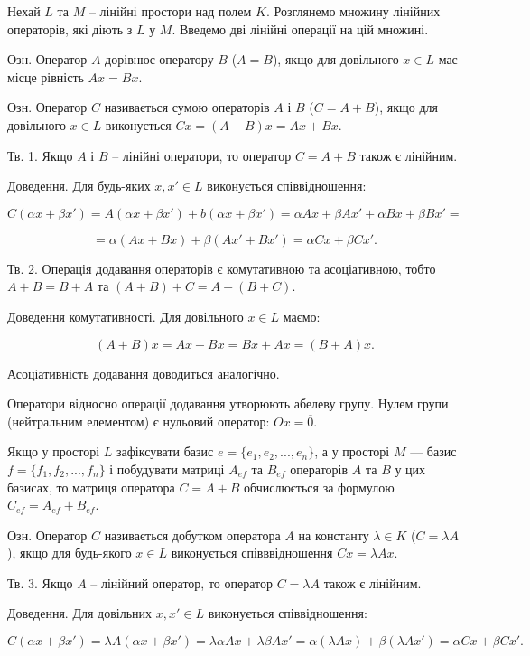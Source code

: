 Нехай $L$ та $M$ -- лінійні простори над полем $K$. Розглянемо множину лінійних
операторів, які діють з $L$ у $M$. Введемо дві лінійні операції на цій множині.


Озн. Оператор $A$ дорівнює оператору $B$ ($A = B$), якщо для довільного $x \in L$
має місце рівність $A x = B x$.


Озн. Оператор $C$ називається сумою операторів $A$ і $B$ ($C = A + B$), якщо для
довільного $x \in L$ виконується $C x = (A + B)x = A x + B x$.


Тв. 1. Якщо $A$ і $B$ -- лінійні оператори, то оператор $C = A + B$ також є
лінійним.

Доведення. Для будь-яких $x, x' \in L$ виконується співвідношення:

$$C(\alpha x + \beta x') = A(\alpha x + \beta x') + b(\alpha x + \beta x') = \alpha A x + \beta A x' + \alpha B x + \beta B x' =$$

$$= \alpha(A x + B x) + \beta(A x' + B x') = \alpha C x + \beta C x'.$$


Тв. 2. Операція додавання операторів є комутативною та асоціативною, тобто
$A + B = B + A$ та $(A + B) + C = A + (B + C).$

Доведення комутативності. Для довільного $x \in L$ маємо:

$$(A + B)x = A x + B x = B x + A x = (B + A) x.$$


Асоціативність додавання доводиться аналогічно.

Оператори відносно операції додавання утворюють абелеву групу. Нулем
групи (нейтральним елементом) є нульовий оператор: $Ox = \overline{0}$.


Якщо у просторі $L$ зафіксувати базис $e = \{e_1, e_2, ..., e_n\}$, а у просторі $M$ ---
базис $f = \{f_1, f_2, ..., f_n\}$ і побудувати матриці $A_{ef}$ та $B_{ef}$ операторів $A$ та $B$ у
цих базисах, то матриця оператора $C = A + B$ обчислюється за формулою
$C_{ef} = A_{ef} + B_{ef}$.


Озн. Оператор $C$ називається добутком оператора $A$ на константу $\lambda \in K$
($C = \lambda A$), якщо для будь-якого $x \in L$ виконується співввідношення $C x = \lambda A x$.


Тв. 3. Якщо $A$ -- лінійний оператор, то оператор $C = \lambda A$ також є лінійним.

Доведення. Для довільних $x, x' \in L$ виконується співвідношення:

$$C(\alpha x + \beta x') = \lambda A(\alpha x + \beta x') = \lambda \alpha A x + \lambda \beta A x'
= \alpha (\lambda A x) + \beta(\lambda A x') = \alpha C x + \beta C x'.$$


